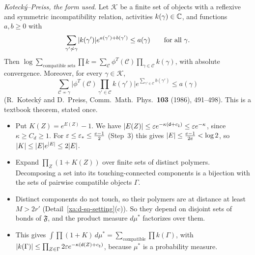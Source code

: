 \begin{detail}\label{xa:d-mayer}
\emph{Kotecký--Preiss, the form used.} Let $\mathcal K$ be a finite set of objects with a reflexive and symmetric incompatibility relation, activities $k(\gamma)\in\mathbb C$, and functions $a,b\ge0$ with
\[
\sum_{\gamma'\not\sim\gamma}\lvert k(\gamma')\rvert e^{a(\gamma')+b(\gamma')}\le a(\gamma)\qquad\text{for all }\gamma .
\]
Then $\log\sum_{\text{compatible sets}}\prod k=\sum_{\mathcal C}\phi^T(\mathcal C)\prod_{\gamma\in\mathcal C}k(\gamma)$, with absolute convergence. Moreover, for every $\gamma\in\mathcal K$,
\[
\sum_{\mathcal C\not\sim\gamma}\Big|\phi^T(\mathcal C)\prod_{\gamma'\in\mathcal C}k(\gamma')\Big|e^{\sum_{\gamma'\in\mathcal C}b(\gamma')}\le a(\gamma)
\]
(R.~Koteck\'y and D.~Preiss, Comm.\ Math.\ Phys.\ \textbf{103} (1986), 491--498). This is a textbook theorem, stated once.

\begin{step}
\begin{itemize}
\item Put $K(Z)=e^{E(Z)}-1$. We have $\lvert E(Z)\rvert\le\varepsilon e^{-\kappa(\mathsf d+c_\natural)}\le\varepsilon e^{-\kappa}$, since $\kappa\ge C_d\ge1$. For $\varepsilon\le\varepsilon_*\le\frac{e-1}2$ (Step~3) this gives $\lvert E\rvert\le\frac{e-1}{2e}<\log2$, so $\lvert K\rvert\le\lvert E\rvert e^{\lvert E\rvert}\le2\lvert E\rvert$.
\item Expand $\prod_Z(1+K(Z))$ over finite sets of distinct polymers. Decomposing a set into its touching-connected components is a bijection with the sets of pairwise compatible objects $\Gamma$.
\item Distinct components do not touch, so their polymers are at distance at least $M>2r'$ (Detail~\ref{xa:d-sq-setting}(c)). So they depend on disjoint sets of bonds of $\mathfrak F$, and the product measure $d\mu^*$ factorizes over them.
\item This gives $\int\prod(1+K)\,d\mu^*=\sum_{\text{compatible}}\prod k(\Gamma)$, with $\lvert k(\Gamma)\rvert\le\prod_{Z\in\Gamma}2\varepsilon e^{-\kappa(\mathsf d(Z)+c_\natural)}$, because $\mu^*$ is a probability measure.
\end{itemize}
\end{step}


\end{detail}
